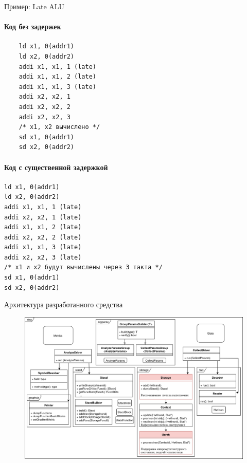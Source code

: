 \documentclass[10pt,aspectratio=169,hyperref={pdftex,unicode},xcolor=dvipsnames]{beamer}
\begin{document}
\begin{frame}[fragile]{ Пример: Late ALU }
    \begin{minipage}[]{\linewidth}
    \begin{minipage}[]{0.5\linewidth}
    \centering
    \paragraph{Код без задержек}
    \noindent
    \begin{verbatim}
    ld x1, 0(addr1)
    ld x2, 0(addr2)
    addi x1, x1, 1 (late)
    addi x1, x1, 2 (late)
    addi x1, x1, 3 (late)
    addi x2, x2, 1
    addi x2, x2, 2
    addi x2, x2, 3
    /* x1, x2 вычислено */
    sd x1, 0(addr1)
    sd x2, 0(addr2)
    \end{verbatim}
    \end{minipage}
    \begin{minipage}[]{0.50\linewidth}
    \centering
    \paragraph{Код с существенной задержкой}
    \noindent
    \begin{verbatim}
ld x1, 0(addr1)
ld x2, 0(addr2)
addi x1, x1, 1 (late)
addi x2, x2, 1 (late)
addi x1, x1, 2 (late)
addi x2, x2, 2 (late)
addi x1, x1, 3 (late)
addi x2, x2, 3 (late)
/* x1 и x2 будут вычислены через 3 такта */
sd x1, 0(addr1)
sd x2, 0(addr2)
    \end{verbatim}
    \end{minipage}
\end{minipage}

\end{frame}

\begin{frame}{ Архитектура разработанного средства }
    \begin{figure}
        \centering
        \includegraphics[height=0.8\textheight,keepaspectratio]{./images/stac_classes.png}
    \end{figure}
\end{frame}
\end{document}
